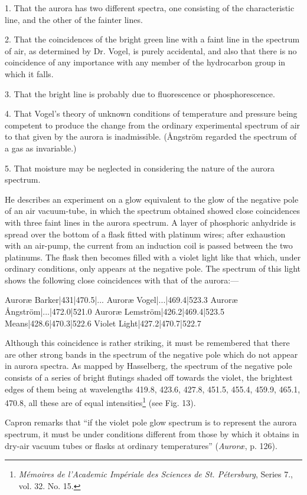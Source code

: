 \documentclass[a4paper, 12pt, oneside, polutonikogreek, english]{article}
\begin{document}
1. That the aurora has two different spectra, one consisting of the characteristic line, and the other of the fainter lines.

2. That the coincidences of the bright green line with a faint line in the spectrum of air, as determined by Dr. Vogel, is purely accidental, and also that there is no coincidence of any importance with any member of the hydrocarbon group in which it falls.

3. That the bright line is probably due to fluorescence or phosphorescence.

4. That Vogel's theory of unknown conditions of temperature and pressure being competent to produce the change from the ordinary experimental spectrum of air to that given by the aurora is inadmissible. (Ångström regarded the spectrum of a gas as invariable.)

5. That moisture may be neglected in considering the nature of the aurora spectrum.

He describes an experiment on a glow equivalent to the glow of the negative pole of an air vacuum-tube, in which the spectrum obtained showed close coincidences with three faint lines in the aurora spectrum. A layer of phosphoric anhydride is spread over the bottom of a flask fitted with platinum wires; after exhaustion with an air-pump, the current from an induction coil is passed between the two platinums. The flask then becomes filled with a violet light like that which, under ordinary conditions, only appears at the negative pole. The spectrum of this light shows the following close coincidences with that of the aurora:---

Auroræ Barker|431|470.5|... 
Auroræ Vogel|...|469.4|523.3 
Auroræ Ångström|...|472.0|521.0 
Auroræ Lemström|426.2|469.4|523.5 
Means|428.6|470.3|522.6 
Violet Light|427.2|470.7|522.7 

Although this coincidence is rather striking, it must be remembered that there are other strong bands in the spectrum of the negative pole which do not appear in aurora spectra. As mapped by Hasselberg, the spectrum of the negative pole consists of a series of bright flutings shaded off towards the violet, the brightest edges of them being at wavelengths 419.8, 423.6, 427.8, 451.5, 455.4, 459.9, 465.1, 470.8, all these are of equal intensities\footnote{\emph{Mémoires de l'Academic Impériale des Sciences de St. Pétersburg}, Series 7., vol. 32. No. 15.} (see Fig. 13).

Capron remarks that ``if the violet pole glow spectrum is to represent the aurora spectrum, it must be under conditions different from those by which it obtains in dry-air vacuum tubes or flasks at ordinary temperatures'' (\emph{Auroræ}, p. 126).
\end{document}
